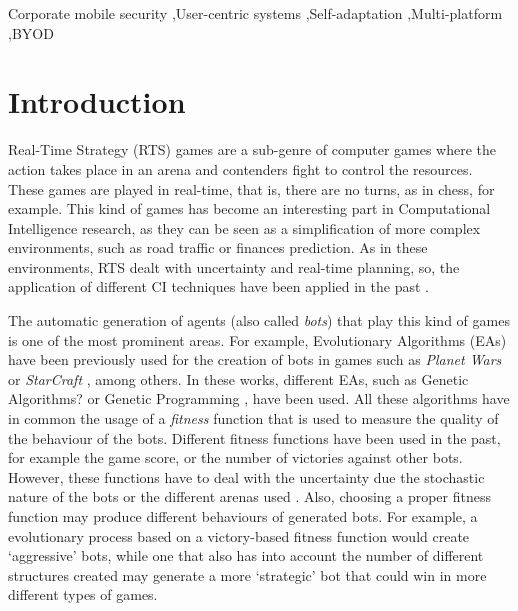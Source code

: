 \documentclass[preprint]{elsarticle}
\begin{document}
\begin{frontmatter}
%
%
\begin{keyword}
Corporate mobile security \sep User-centric systems \sep Self-adaptation \sep Multi-platform \sep BYOD
\end{keyword}

\end{frontmatter}


\section{Introduction}
\noindent 

Real-Time Strategy (RTS) games are a sub-genre of computer games where the action takes place in an arena and contenders fight to control the resources. These games are played in real-time, that is, there are no turns, as in chess, for example. This kind of games has become an interesting part in Computational Intelligence research, as they can be seen as a simplification of more complex environments, such as road traffic or finances prediction. As in these environments, RTS dealt with uncertainty and real-time planning, so, the application of different CI techniques have been applied in the past \cite{Lara2013review}.

The automatic generation of agents (also called {\em bots}) that play this kind of games is one of the most prominent areas. For example, Evolutionary Algorithms (EAs) have been previously used for the creation of bots in games such as {\em Planet Wars} \cite{Genebot_CEC11,ExpGenebot_CIG2012} or {\em StarCraft} \cite{Garcia15Starcraft}, among others. In these works, different EAs, such as Genetic Algorithms?\cite{ExpGenebot_CIG2012} or Genetic Programming \cite{Garcia14Treedepth}, have been used. All these algorithms have in common the usage of a {\em fitness} function that is used to measure the quality of the behaviour of the bots. Different fitness functions have been used in the past, for example the game score, or the number of victories against other bots. However, these functions have to deal with the uncertainty due the stochastic nature of the bots or the different arenas used \cite{wilcoxon:ga}. Also, choosing a proper fitness function may produce different behaviours of generated bots. For example, a evolutionary process based on a victory-based fitness function would create `aggressive' bots, while one that also has into account the number of different structures created may generate a more `strategic' bot that could win in more different types of games. 
\end{document}
